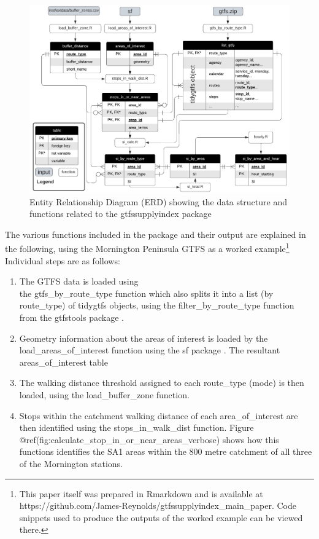\documentclass[preprint, 3p,
authoryear]{elsarticle} %
\begin{document}
\begin{figure}
\includegraphics[width=1\linewidth]{graphics/SI_data_structure} \caption{Entity Relationship Diagram (ERD) showing the data structure and functions related to the gtfssupplyindex package}\label{fig:SI_ERD}
\end{figure}

The various functions included in the package and their output are
explained in the following, using the Mornington Peninsula GTFS as a
worked example\footnote{This paper itself was prepared in Rmarkdown and
  is available at
  https://github.com/James-Reynolds/gtfssupplyindex\_main\_paper. Code
  snippets used to produce the outputs of the worked example can be
  viewed there.} Individual steps are as follows:

\begin{enumerate}
\def\labelenumi{(\arabic{enumi})}
\item
  The GTFS data is loaded using\\
  the gtfs\_by\_route\_type function which also splits it into a list
  (by route\_type) of tidygtfs objects, using the
  filter\_by\_route\_type function from the gtfstools package
  \citep{filter_GTFS_by_mode}.
\item
  Geometry information about the areas of interest is loaded by the
  load\_areas\_of\_interest function using the sf package \citep{R-sf}.
  The resultant areas\_of\_interest table
\item
  The walking distance threshold assigned to each route\_type (mode) is
  then loaded, using the load\_buffer\_zone function.
\item
  Stops within the catchment walking distance of each area\_of\_interest
  are then identified using the stops\_in\_walk\_dist function. Figure
  @ref(fig:calculate\_stop\_in\_or\_near\_areas\_verbose) shows how this
  functions identifies the SA1 areas within the 800 metre catchment of
  all three of the Mornington stations.
\end{enumerate}
\end{document}
